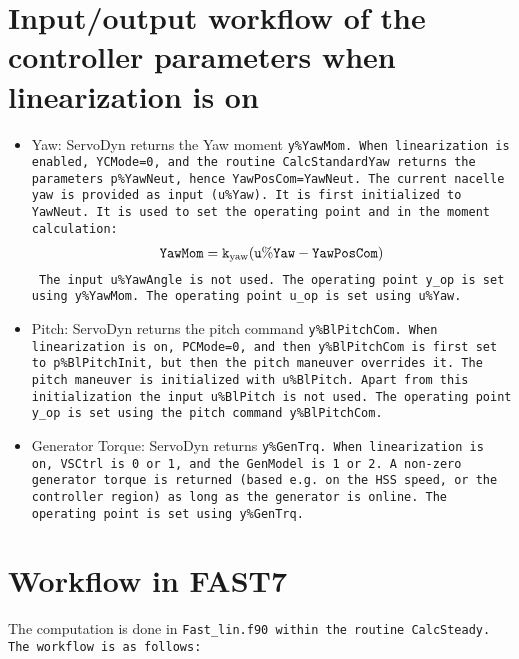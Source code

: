 \section{Input/output workflow of the controller parameters when linearization is on}
\begin{itemize}
    \item Yaw: ServoDyn returns the Yaw moment \tt{y\%YawMom}. 
        When linearization is enabled, \tt{YCMode=0}, and the routine \tt{CalcStandardYaw} returns the parameters \tt{p\%YawNeut}, hence \tt{YawPosCom}=\tt{YawNeut}. 
        The current nacelle yaw is provided as input (\tt{u\%Yaw}). It is first initialized to \tt{YawNeut}. It is used to set the operating point and in the moment calculation:
        \begin{align}
            \tt{YawMom} = k_\text{yaw} ( \tt{u\%Yaw} - \tt{YawPosCom} )
        \end{align}
        The input \tt{u\%YawAngle} is not used.
        The operating point \tt{y\_op} is set using \tt{y\%YawMom}.
        The operating point \tt{u\_op} is set using \tt{u\%Yaw}.
    \item Pitch: ServoDyn returns the pitch command \tt{y\%BlPitchCom}.
        When linearization is on, \tt{PCMode=0}, and then \tt{y\%BlPitchCom} is first set to \tt{p\%BlPitchInit}, but then the pitch maneuver overrides it. 
        The pitch maneuver is initialized with \tt{u\%BlPitch}.
        Apart from this initialization the input \tt{u\%BlPitch} is not used.
        The operating point \tt{y\_op} is set using the pitch command \tt{y\%BlPitchCom}.
    \item Generator Torque: ServoDyn returns \tt{y\%GenTrq}. 
        When linearization is on, \tt{VSCtrl} is 0 or 1, and the \tt{GenModel} is 1 or 2. 
        A non-zero generator torque is returned (based e.g. on the HSS speed, or the controller region) as long as the generator is online.
        The operating point is set using \tt{y\%GenTrq}.
\end{itemize}





\section{Workflow in FAST7}\label{old-workflow}
The computation is done in \tt{Fast\_lin.f90} within the routine \tt{CalcSteady}.
The workflow is as follows:

